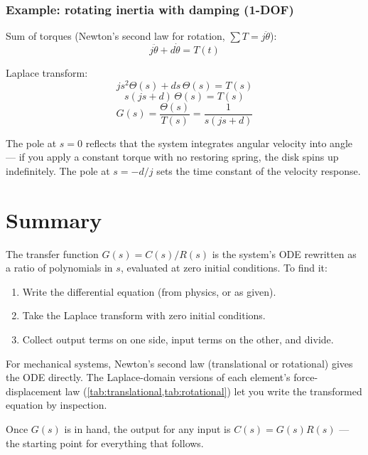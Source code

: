 \documentclass[../../book.tex]{subfiles}
\begin{document}
\subsubsection*{Example: rotating inertia with damping (1-DOF)}


Sum of torques (Newton's second law for rotation, $\sum T = j\ddot{\theta}$):
\begin{equation}
  j\ddot{\theta} + d\dot{\theta} = T(t)
  \label{eq:rot_ode}
\end{equation}

Laplace transform:
\[
  j s^2 \Theta(s) + d s \, \Theta(s) = T(s)
\]
\[
  s (j s + d) \, \Theta(s) = T(s)
\]
\begin{equation}
  G(s) = \frac{\Theta(s)}{T(s)} = \frac{1}{s (j s + d)}
  \label{eq:rot_tf}
\end{equation}

The pole at $s = 0$ reflects that the system integrates angular velocity into
angle --- if you apply a constant torque with no restoring spring, the disk
spins up indefinitely.  The pole at $s = -d/j$ sets the time constant of the
velocity response.

\section{Summary}
\label{sec:summary}

The transfer function $G(s) = C(s)/R(s)$ is the system's ODE rewritten as a
ratio of polynomials in $s$, evaluated at zero initial conditions.  To find
it:
\begin{enumerate}
  \item Write the differential equation (from physics, or as given).
  \item Take the Laplace transform with zero initial conditions.
  \item Collect output terms on one side, input terms on the other, and divide.
\end{enumerate}

For mechanical systems, Newton's second law (translational or rotational)
gives the ODE directly.  The Laplace-domain versions of each element's
force-displacement law (\cref{tab:translational,tab:rotational}) let you write
the transformed equation by inspection.

Once $G(s)$ is in hand, the output for any input is $C(s) = G(s)R(s)$ --- the
starting point for everything that follows.
\end{document}
